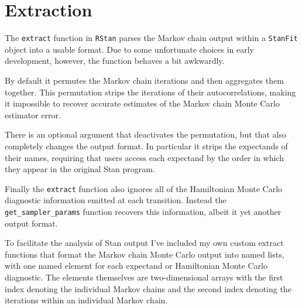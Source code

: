 \documentclass[
  letterpaper,
  DIV=11,
  numbers=noendperiod]{scrartcl}
\begin{document}
\hypertarget{extraction}{%
\section{Extraction}\label{extraction}}

The \texttt{extract} function in \texttt{RStan} parses the Markov chain
output within a \texttt{StanFit} object into a usable format. Due to
some unfortunate choices in early development, however, the function
behaves a bit awkwardly.

By default it permutes the Markov chain iterations and then aggregates
them together. This permutation strips the iterations of their
autocorrelations, making it impossible to recover accurate estimates of
the Markov chain Monte Carlo estimator error.

There is an optional argument that deactivates the permutation, but that
also completely changes the output format. In particular it strips the
expectands of their names, requiring that users access each expectand by
the order in which they appear in the original Stan program.

Finally the \texttt{extract} function also ignores all of the
Hamiltonian Monte Carlo diagnostic information emitted at each
transition. Instead the \texttt{get\_sampler\_params} function recovers
this information, albeit it yet another output format.

To facilitate the analysis of Stan output I've included my own custom
extract functions that format the Markov chain Monte Carlo output into
named lists, with one named element for each expectand or Hamiltonian
Monte Carlo diagnostic. The elements themselves are two-dimensional
arrays with the first index denoting the individual Markov chains and
the second index denoting the iterations within an individual Markov
chain.
\end{document}
